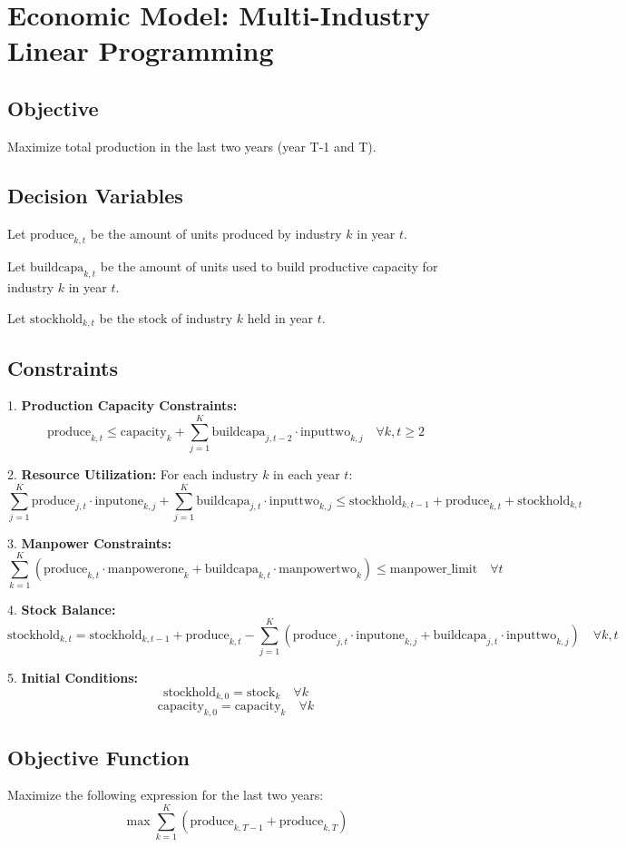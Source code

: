 \documentclass{article}
\begin{document}
\section*{Economic Model: Multi-Industry Linear Programming}

\subsection*{Objective}
Maximize total production in the last two years (year T-1 and T).

\subsection*{Decision Variables}
Let \( \text{produce}_{k, t} \) be the amount of units produced by industry \( k \) in year \( t \).

Let \( \text{buildcapa}_{k, t} \) be the amount of units used to build productive capacity for industry \( k \) in year \( t \).

Let \( \text{stockhold}_{k, t} \) be the stock of industry \( k \) held in year \( t \).

\subsection*{Constraints}

1. \textbf{Production Capacity Constraints:}
   \[
   \text{produce}_{k, t} \leq \text{capacity}_{k} + \sum_{j=1}^{K} \text{buildcapa}_{j, t-2} \cdot \text{inputtwo}_{k, j} \quad \forall k, t \geq 2
   \]

2. \textbf{Resource Utilization:} For each industry \( k \) in each year \( t \):
   \[
   \sum_{j=1}^{K} \text{produce}_{j, t} \cdot \text{inputone}_{k, j} + \sum_{j=1}^{K} \text{buildcapa}_{j, t} \cdot \text{inputtwo}_{k, j} \leq \text{stockhold}_{k, t-1} + \text{produce}_{k, t} + \text{stockhold}_{k, t}
   \]

3. \textbf{Manpower Constraints:}
   \[
   \sum_{k=1}^{K} \left( \text{produce}_{k, t} \cdot \text{manpowerone}_{k} + \text{buildcapa}_{k, t} \cdot \text{manpowertwo}_{k} \right) \leq \text{manpower\_limit} \quad \forall t
   \]

4. \textbf{Stock Balance:}
   \[
   \text{stockhold}_{k, t} = \text{stockhold}_{k, t-1} + \text{produce}_{k, t} - \sum_{j=1}^{K} \left( \text{produce}_{j, t} \cdot \text{inputone}_{k, j} + \text{buildcapa}_{j, t} \cdot \text{inputtwo}_{k, j} \right) \quad \forall k, t
   \]

5. \textbf{Initial Conditions:}
   \[
   \text{stockhold}_{k, 0} = \text{stock}_{k} \quad \forall k
   \]
   \[
   \text{capacity}_{k, 0} = \text{capacity}_{k} \quad \forall k
   \]

\subsection*{Objective Function}
Maximize the following expression for the last two years:
\[
\max \sum_{k=1}^{K} \left( \text{produce}_{k, T-1} + \text{produce}_{k, T} \right)
\]
\end{document}
